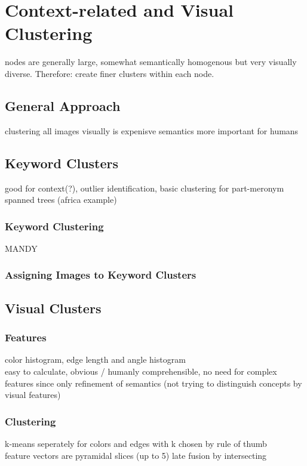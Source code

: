 %
\section{Context-related and Visual Clustering}
\label{sec_inhalt}

nodes are generally large, somewhat semantically homogenous but very visually diverse. Therefore: create finer clusters within each node.

\subsection{General Approach}
clustering all images visually is expenisve
semantics more important for humans

\subsection{Keyword Clusters}
good for context(?), outlier identification, basic clustering for part-meronym spanned trees (africa example)

\subsubsection{Keyword Clustering}
MANDY
\subsubsection{Assigning Images to Keyword Clusters}


\subsection{Visual Clusters}

\subsubsection{Features}
color  histogram, edge length and angle histogram \\
easy to calculate, obvious / humanly comprehensible, no need for complex features since only refinement of semantics (not trying to distinguish concepts by visual features)

\subsubsection{Clustering}
k-means seperately for colors and edges with k chosen by rule of thumb \\
feature vectors are pyramidal slices (up to 5)
late fusion by intersecting
